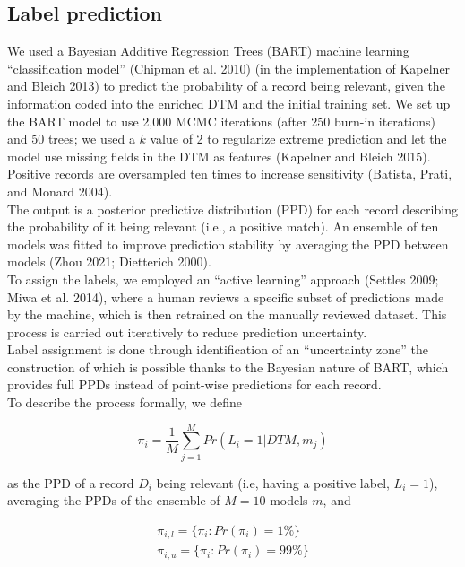 \documentclass{article}
\begin{document}
\hypertarget{label-prediction}{%
\subsection{Label prediction}\label{label-prediction}}

We used a Bayesian Additive Regression Trees (BART) machine learning
``classification model'' (Chipman et al. 2010) (in the implementation of
Kapelner and Bleich 2013) to predict the probability of a record being
relevant, given the information coded into the enriched DTM and the
initial training set. We set up the BART model to use 2,000 MCMC
iterations (after 250 burn-in iterations) and 50 trees; we used a \(k\)
value of 2 to regularize extreme prediction and let the model use
missing fields in the DTM as features (Kapelner and Bleich 2015).
Positive records are oversampled ten times to increase sensitivity
(Batista, Prati, and Monard 2004).\\
The output is a posterior predictive distribution (PPD) for each record
describing the probability of it being relevant (i.e., a positive
match). An ensemble of ten models was fitted to improve prediction
stability by averaging the PPD between models (Zhou 2021; Dietterich
2000).\\

To assign the labels, we employed an ``active learning'' approach
(Settles 2009; Miwa et al. 2014), where a human reviews a specific
subset of predictions made by the machine, which is then retrained on
the manually reviewed dataset. This process is carried out iteratively
to reduce prediction uncertainty.\\
Label assignment is done through identification of an ``uncertainty
zone'' the construction of which is possible thanks to the Bayesian
nature of BART, which provides full PPDs instead of point-wise
predictions for each record.\\
To describe the process formally, we define

\[\pi_i = \frac{1}{M}\sum_{j=1}^M Pr(L_i = \text{1}|DTM,m_j)\]

as the PPD of a record \(D_i\) being relevant (i.e, having a positive
label, \(L_i = 1\)), averaging the PPDs of the ensemble of \(M=10\)
models \(m\), and

\[
\begin{aligned}
\pi_{i,l} = \{\pi_i : Pr(\pi_i) = 1\%\}\\
\pi_{i,u} = \{\pi_i : Pr(\pi_i) = 99\%\}
\end{aligned}
\]
\end{document}
